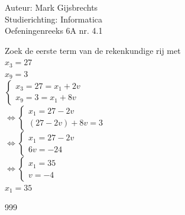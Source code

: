 \documentclass[a4paper]{article}
\begin{document}
\noindent \large Auteur: Mark Gijsbrechts \\
\noindent \large Studierichting: Informatica\\
\noindent \large Oefeningenreeks 6A nr. 4.1\\

\medskip

\normalsize



Zoek de eerste term van de rekenkundige rij met \\

$ x_{3} = 27 $ \\

$ x_{9} = 3 $ \\


$ \left\{
\begin{array}{l}
    x_{3} = 27 = x_{1} + 2v \\
    x_{9} = 3 =  x_{1} + 8v  
\end{array}
\right.$ \\

$\Leftrightarrow \left\{
\begin{array}{l}
    x_{1} = 27 - 2v \\
    \left( 27 - 2v \right) + 8v = 3 
\end{array}
\right.$ \\

$\Leftrightarrow \left\{
\begin{array}{l}
    x_{1} = 27 - 2v \\
    6v = -24 
\end{array}
\right.$ \\

$\Leftrightarrow \left\{
\begin{array}{l}
    x_{1} = 35 \\
    v = -4 
\end{array}
\right.$ \\

$ x_{1} = 35 $ \\



\begin{thebibliography}{999}
\end{thebibliography}
\end{document}
